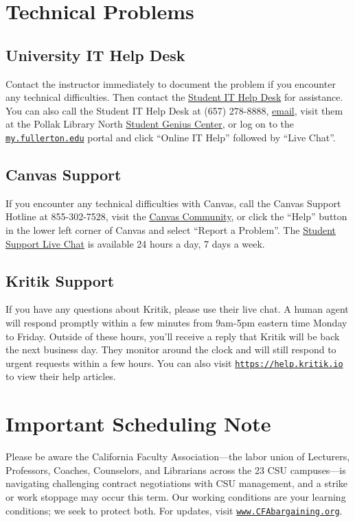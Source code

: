 \documentclass[12pt, letterpaper]{article}
\begin{document}
\section*{Technical Problems}

\subsection*{University IT Help Desk}

Contact the instructor immediately to document the problem if you encounter any technical difficulties. Then contact the \href{http://www.fullerton.edu/it/students/helpdesk/index.php}{Student IT Help Desk} for assistance. You can also call the Student IT Help Desk at (657) 278-8888, \href{mailto:StudentITHelpDesk@fullerton.edu}{email}, visit them at the Pollak Library North \href{http://www.fullerton.edu/it/students/sgc/index.php}{Student Genius Center}, or log on to the \href{http://my.fullerton.edu/}{\texttt{my.fullerton.edu}} portal and click ``Online IT Help'' followed by ``Live Chat''.

\subsection*{Canvas Support}

If you encounter any technical difficulties with Canvas, call the Canvas Support Hotline at 855-302-7528, visit the \href{https://community.canvaslms.com/docs/DOC-10720-67952720329}{Canvas Community}, or click the ``Help'' button in the lower left corner of Canvas and select ``Report a Problem''. The \href{https://cases.canvaslms.com/liveagentchat?chattype=student&sfid=001A000000YzcwQIAR}{Student Support Live Chat} is available 24 hours a day, 7 days a week.

\subsection*{Kritik Support}

If you have any questions about Kritik, please use their live chat. A human agent will respond promptly within a few minutes from 9am-5pm eastern time Monday to Friday. Outside of these hours, you’ll receive a reply that Kritik will be back the next business day. They monitor around the clock and will still respond to urgent requests within a few hours. You can also visit \href{https://help.kritik.io}{\texttt{https://help.kritik.io}} to view their help articles.

\section*{Important Scheduling Note}

Please be aware the California Faculty Association---the labor union of Lecturers, Professors, Coaches, Counselors, and Librarians across the 23 CSU campuses---is navigating challenging contract negotiations with CSU management, and a strike or work stoppage may occur this term. Our working conditions are your learning conditions; we seek to protect both. For updates, visit \href{www.CFAbargaining.org}{\texttt{www.CFAbargaining.org}}.
    

\singlespace


\end{document}
